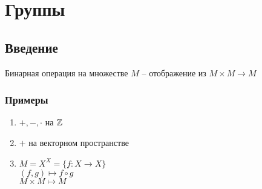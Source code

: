 \documentclass[main]{subfiles}
\begin{document}
\chapter{Группы}
\section{Введение}
\begin{definition}
    Бинарная операция на множестве $M$ -- отображение из $M \times M \to M$
\end{definition}

\subsection{Примеры}
\begin{enumerate}
    \item $+, -, \cdot$ на $\mathbb{Z}$
    \item $+$ на векторном пространстве
    \item $M= X^X = \{f: X \to X\}$\\
          $(f,g) \mapsto f\circ g$\\
          $M \times M \mapsto M$
\end{enumerate}
\end{document}
